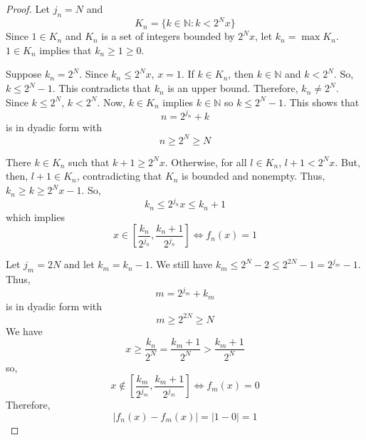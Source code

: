\documentclass[12pt, reqno]{amsart}
\theoremstyle{definition}
\theoremstyle{remark}
\begin{document}
\begin{itemize}
\begin{proof}
Let $j_{n}=N$ and $$K_{n}=\{k\in \mathbb{N}:k<2^{N}x\}$$Since $1\in K_{n}$ and $K_{n}$ is a set of integers bounded by $2^{N}x$, let $k_{n}=\max K_{n}$. $1\in K_{n}$ implies that $k_{n}\ge1\ge0$. 

Suppose $k_{n}=2^{N}$. Since $k_{n}\le 2^{N}x$, $x=1$. If $k\in K_{n}$, then $k\in \mathbb{N}$ and $k<2^{N}$. So, $k\le2^{N}-1$. This contradicts that $k_{n}$ is an upper bound. Therefore, $k_{n}\ne 2^N$. Since $k\le 2^N$, $k<2^N$. Now, $k\in K_{n}$ implies $k\in \mathbb{N}$ so $k\le2^{N}-1$. This shows that $$n=2^{j_{n}}+k$$is in dyadic form with $$n\ge2^{N}\ge N$$

There $k\in K_{n}$ such that $k+1\ge 2^{N}x$. Otherwise, for all $l\in K_n$, $l+1<2^{N}x$. But, then, $l+1\in K_n$, contradicting that $K_n$ is bounded and nonempty. Thus, $k_{n}\ge k\ge 2^{N}x-1$. So, $$k_{n}\le2^{j_{n}}x\le k_{n}+1$$which implies $$x\in\left[ \frac{k_{n}}{2^{j_{n}}}, \frac{k_{n}+1}{2^{j_{n}}}\right]\iff f_{n}(x)=1$$

Let $j_{m}=2N$ and let $k_{m}=k_{n}-1$. We still have $k_{m}\le 2^{N}-2\le2^{2N}-1=2^{j_{m}}-1$. Thus, $$m=2^{j_{m}}+k_{m}$$is in dyadic form with $$m\ge2^{2N}\ge N$$
We have $$x\ge \frac{k_{n}}{2^{N}}= \frac{k_{m}+1}{2^{N}}> \frac{k_{m}+1}{2^{N}}$$so, $$x\notin\left[\frac{k_{m}}{2^{j_{m}}}, \frac{k_{m}+1}{2^{j_{m}}}\right]\iff f_{m}(x)=0$$
Therefore, \[|f_{n}(x)-f_{m}(x)|=|1-0|=1\]
\end{proof}



\end{itemize}
\end{document}
